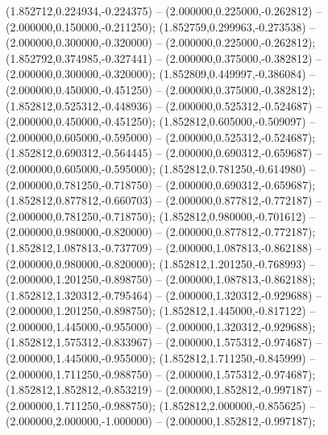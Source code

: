  (1.852712,0.224934,-0.224375) -- (2.000000,0.225000,-0.262812) -- (2.000000,0.150000,-0.211250);
 (1.852759,0.299963,-0.273538) -- (2.000000,0.300000,-0.320000) -- (2.000000,0.225000,-0.262812);
 (1.852792,0.374985,-0.327441) -- (2.000000,0.375000,-0.382812) -- (2.000000,0.300000,-0.320000);
 (1.852809,0.449997,-0.386084) -- (2.000000,0.450000,-0.451250) -- (2.000000,0.375000,-0.382812);
 (1.852812,0.525312,-0.448936) -- (2.000000,0.525312,-0.524687) -- (2.000000,0.450000,-0.451250);
 (1.852812,0.605000,-0.509097) -- (2.000000,0.605000,-0.595000) -- (2.000000,0.525312,-0.524687);
 (1.852812,0.690312,-0.564445) -- (2.000000,0.690312,-0.659687) -- (2.000000,0.605000,-0.595000);
 (1.852812,0.781250,-0.614980) -- (2.000000,0.781250,-0.718750) -- (2.000000,0.690312,-0.659687);
 (1.852812,0.877812,-0.660703) -- (2.000000,0.877812,-0.772187) -- (2.000000,0.781250,-0.718750);
 (1.852812,0.980000,-0.701612) -- (2.000000,0.980000,-0.820000) -- (2.000000,0.877812,-0.772187);
 (1.852812,1.087813,-0.737709) -- (2.000000,1.087813,-0.862188) -- (2.000000,0.980000,-0.820000);
 (1.852812,1.201250,-0.768993) -- (2.000000,1.201250,-0.898750) -- (2.000000,1.087813,-0.862188);
 (1.852812,1.320312,-0.795464) -- (2.000000,1.320312,-0.929688) -- (2.000000,1.201250,-0.898750);
 (1.852812,1.445000,-0.817122) -- (2.000000,1.445000,-0.955000) -- (2.000000,1.320312,-0.929688);
 (1.852812,1.575312,-0.833967) -- (2.000000,1.575312,-0.974687) -- (2.000000,1.445000,-0.955000);
 (1.852812,1.711250,-0.845999) -- (2.000000,1.711250,-0.988750) -- (2.000000,1.575312,-0.974687);
 (1.852812,1.852812,-0.853219) -- (2.000000,1.852812,-0.997187) -- (2.000000,1.711250,-0.988750);
 (1.852812,2.000000,-0.855625) -- (2.000000,2.000000,-1.000000) -- (2.000000,1.852812,-0.997187);
